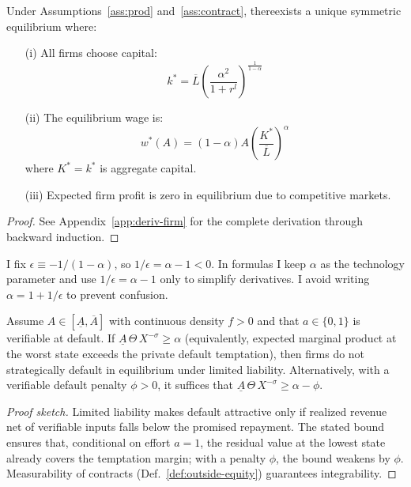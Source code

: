 \documentclass[12pt]{article}
\begin{document}
\begin{proposition}
\label{prop:firm-eq}
Under Assumptions~\ref{ass:prod} and~\ref{ass:contract}, there\Allow exists a unique symmetric equilibrium where:
\begin{enumerate}
    \item[(i)] All firms choose capital:
    \begin{equation}
        k^{*} = \overline{L}\left(\frac{\alpha^{2}}{1+r^{l}}\right)^{\frac{1}{1-\alpha}}
    \end{equation}
    \item[(ii)] The equilibrium wage is:
    \begin{equation}
        w^{*}(A) = (1-\alpha)A\left(\frac{K^{*}}{\overline{L}}\right)^{\alpha}
    \end{equation}
    where $K^{*} = k^{*}$ is aggregate capital.
    \item[(iii)] Expected firm profit is zero in equilibrium due to competitive markets.
\end{enumerate}
\end{proposition}

\begin{proof}
See Appendix~\ref{app:deriv-firm} for the complete derivation through backward induction.
\end{proof}

\begin{remark}
    I fix $\epsilon \equiv -1/(1-\alpha)$, so $1/\epsilon=\alpha-1<0$. In formulas I keep $\alpha$ as the technology parameter and use $1/\epsilon=\alpha-1$ only to simplify derivatives. I avoid writing $\alpha=1+1/\epsilon$ to prevent confusion.
    \end{remark}    

\begin{lemma}\label{lem:nostrategicdefault}
Assume $A\in[\underline A,\overline A]$ with continuous density $f>0$ and that $a\in\{0,1\}$ is verifiable at default. If $\underline A\,\Theta\,X^{-\sigma} \ge \alpha$ (equivalently, expected marginal product at the worst state exceeds the private default temptation), then firms do not strategically default in equilibrium under limited liability. Alternatively, with a verifiable default penalty $\phi>0$, it suffices that $\underline A\,\Theta\,X^{-\sigma} \ge \alpha-\phi$.
\end{lemma}
\begin{proof}[Proof sketch]
Limited liability makes default attractive only if realized revenue net of verifiable inputs falls below the promised repayment. The stated bound ensures that, conditional on effort $a=1$, the residual value at the lowest state already covers the temptation margin; with a penalty $\phi$, the bound weakens by $\phi$. Measurability of contracts (Def.~\ref{def:outside-equity}) guarantees integrability.
\end{proof}
\end{document}
